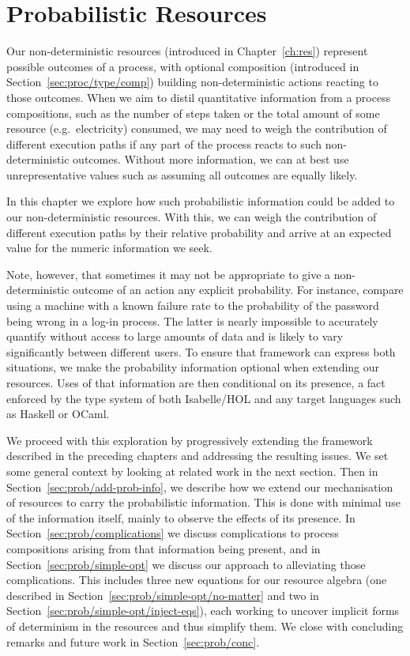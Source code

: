 \documentclass[class=smolathesis,crop=false]{standalone}
\begin{document}
\chapter{Probabilistic Resources}
\label{ch:prob}

Our non-deterministic resources (introduced in Chapter~\ref{ch:res}) represent possible outcomes of a process, with optional composition (introduced in Section~\ref{sec:proc/type/comp}) building non-deterministic actions reacting to those outcomes.
When we aim to distil quantitative information from a process compositions, such as the number of steps taken or the total amount of some resource (e.g.\ electricity) consumed, we may need to weigh the contribution of different execution paths if any part of the process reacts to such non-deterministic outcomes.
Without more information, we can at best use unrepresentative values such as assuming all outcomes are equally likely.

In this chapter we explore how such probabilistic information could be added to our non-deterministic resources.
With this, we can weigh the contribution of different execution paths by their relative probability and arrive at an expected value for the numeric information we seek.

Note, however, that sometimes it may not be appropriate to give a non-deterministic outcome of an action any explicit probability.
For instance, compare using a machine with a known failure rate to the probability of the password being wrong in a log-in process.
The latter is nearly impossible to accurately quantify without access to large amounts of data and is likely to vary significantly between different users.
To ensure that framework can express both situations, we make the probability information optional when extending our resources.
Uses of that information are then conditional on its presence, a fact enforced by the type system of both Isabelle/HOL and any target languages such as Haskell or OCaml.

We proceed with this exploration by progressively extending the framework described in the preceding chapters and addressing the resulting issues.
We set some general context by looking at related work in the next section.
Then in Section~\ref{sec:prob/add-prob-info}, we describe how we extend our mechanisation of resources to carry the probabilistic information.
This is done with minimal use of the information itself, mainly to observe the effects of its presence.
In Section~\ref{sec:prob/complications} we discuss complications to process compositions arising from that information being present, and in Section~\ref{sec:prob/simple-opt} we discuss our approach to alleviating those complications.
This includes three new equations for our resource algebra (one described in Section~\ref{sec:prob/simple-opt/no-matter} and two in Section~\ref{sec:prob/simple-opt/inject-eqs}), each working to uncover implicit forms of determinism in the resources and thus simplify them.
We close with concluding remarks and future work in Section~\ref{sec:prob/conc}.
\end{document}
